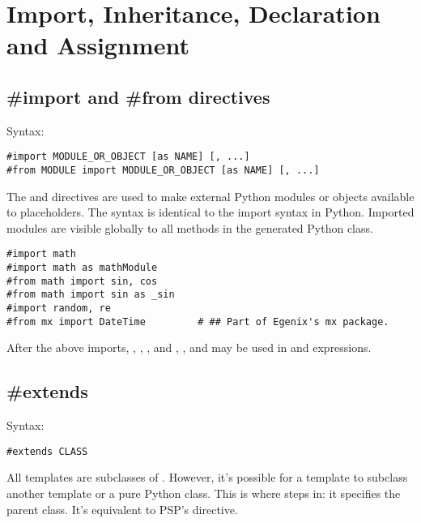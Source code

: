 \section{Import, Inheritance, Declaration and Assignment}
\label{inheritanceEtc}


\subsection{\#import and \#from directives}
\label{inheritanceEtc.import}

Syntax:
\begin{verbatim}
#import MODULE_OR_OBJECT [as NAME] [, ...]
#from MODULE import MODULE_OR_OBJECT [as NAME] [, ...]
\end{verbatim}


The  and  directives are used to make external
Python modules or objects available to placeholders.  The syntax is identical
to the import syntax in Python.  Imported modules are visible globally to all
methods in the generated Python class.

\begin{verbatim}
#import math
#import math as mathModule
#from math import sin, cos
#from math import sin as _sin
#import random, re
#from mx import DateTime         # ## Part of Egenix's mx package.
\end{verbatim}

After the above imports, , , 
,  and , ,  
and  may be used in  and expressions.


\subsection{\#extends}
\label{inheritanceEtc.extends}

Syntax:
\begin{verbatim}
#extends CLASS
\end{verbatim}


All templates are subclasses of .  However,
it's possible for a template to subclass another template or a pure Python
class.  This is where  steps in: it
specifies the parent class.  It's equivalent to PSP's 
directive. 

